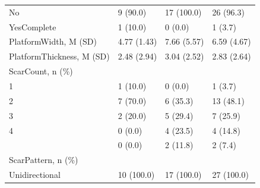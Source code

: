 \documentclass[12pt,twoside]{reedthesis}
\begin{document}
\begin{longtable}[t]{llll}
No & 9 (90.0) & 17 (100.0) & 26 (96.3)\\
YesComplete & 1 (10.0) & 0 (0.0) & 1 (3.7)\\
PlatformWidth, M (SD) & 4.77 (1.43) & 7.66 (5.57) & 6.59 (4.67)\\
PlatformThickness, M (SD) & 2.48 (2.94) & 3.04 (2.52) & 2.83 (2.64)\\
\addlinespace
ScarCount, n (\%) &  &  & \\
1 & 1 (10.0) & 0 (0.0) & 1 (3.7)\\
2 & 7 (70.0) & 6 (35.3) & 13 (48.1)\\
3 & 2 (20.0) & 5 (29.4) & 7 (25.9)\\
4 & 0 (0.0) & 4 (23.5) & 4 (14.8)\\
\addlinespace
5 & 0 (0.0) & 2 (11.8) & 2 (7.4)\\
ScarPattern, n (\%) &  &  & \\
Unidirectional & 10 (100.0) & 17 (100.0) & 27 (100.0)\\
\bottomrule
\end{longtable}
\end{document}

